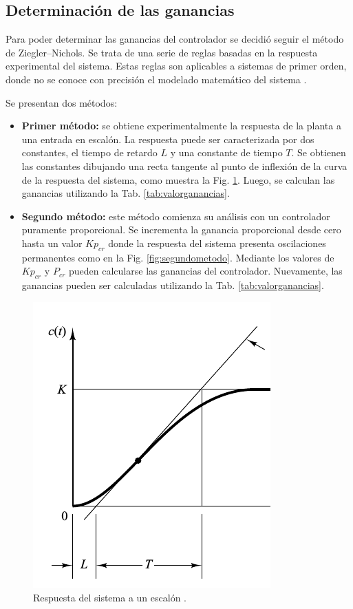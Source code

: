 \subsection{Determinación de las ganancias}

Para poder determinar las ganancias del controlador se decidió seguir el método
de Ziegler–Nichols.
Se trata de una serie de reglas basadas en la respuesta experimental
del sistema.
Estas reglas son aplicables a sistemas de primer orden, donde no se conoce con
precisión el modelado matemático del sistema \cite{bib:Ogata}.

Se presentan dos métodos:
\begin{itemize}
 \item \textbf{Primer método:} se obtiene experimentalmente la respuesta de la
planta a una entrada en escalón.
 La respuesta puede ser caracterizada por dos constantes, el tiempo de retardo
$L$ y una constante de tiempo $T$.
Se obtienen las constantes dibujando
una recta tangente al  punto de inflexión de la curva de la respuesta del
sistema, como muestra la Fig. \ref{fig:primermetodo}.
Luego, se calculan las ganancias utilizando la Tab. \ref{tab:valorganancias}.

 \item \textbf{Segundo método:}
 este método comienza su análisis con un controlador puramente proporcional.
 Se incrementa  la ganancia proporcional desde cero hasta un valor $Kp_{cr} $
donde la respuesta del  sistema presenta oscilaciones permanentes como en la
Fig. \ref{fig:segundometodo}.
 Mediante los valores de $Kp_{cr} $ y $P_{cr}$ pueden calcularse las ganancias
del controlador.
Nuevamente, las ganancias pueden ser calculadas utilizando la Tab.
\ref{tab:valorganancias}.
\end{itemize}

\begin{figure}[ht]
 \centering
 \includegraphics[scale=0.5]{Cap4-ProgramacionPLC/images/primermetodo.png}
 \caption{Respuesta del sistema a un escalón \cite{bib:Ogata}.}
 \label{fig:primermetodo}
\end{figure}

